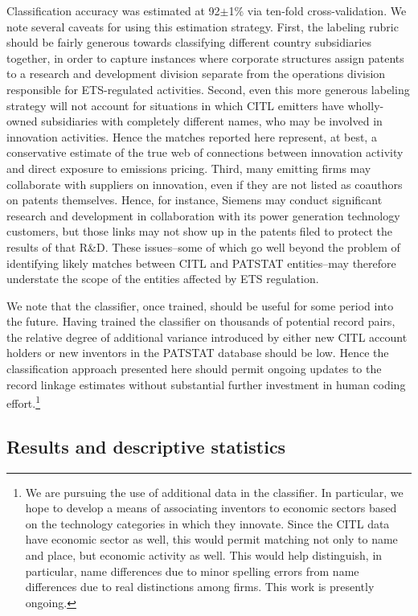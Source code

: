 \documentclass[11pt]{article}
\begin{document}
Classification accuracy was estimated at 92$\pm$1\% via ten-fold
cross-validation. We note several caveats for using this estimation
strategy. First, the labeling rubric should be fairly generous towards
classifying different country subsidiaries together, in order to
capture instances where corporate structures assign patents to a research and
development division separate from the operations division responsible
for ETS-regulated activities. Second, even this more generous labeling
strategy will not account for situations in which CITL emitters have
wholly-owned subsidiaries with completely different names, who may be
involved in innovation activities. Hence the matches reported here
represent, at best, a conservative estimate of the true web of
connections between innovation activity and direct exposure to
emissions pricing. Third, many emitting firms may collaborate with
suppliers on innovation, even if they are not listed as coauthors on
patents themselves. Hence, for instance, Siemens may conduct
significant research and development in collaboration with its power
generation technology customers, but those links may not show up in the patents
filed to protect the results of that R\&D. These issues--some of which
go well beyond the problem of identifying likely matches between CITL
and PATSTAT entities--may therefore understate the scope of the
entities affected by ETS regulation.

We note that the classifier, once trained, should be useful for some
period into the future. Having trained the classifier on thousands of
potential record pairs, the relative degree of additional variance
introduced by either new CITL account holders or new inventors in the
PATSTAT database should be low. Hence the classification approach
presented here should permit ongoing updates to the record linkage
estimates without substantial further investment in human coding
effort.\footnote{We are pursuing the use of additional data in the
  classifier. In particular, we hope to develop a means of associating
inventors to economic sectors based on the technology categories in
which they innovate. Since the CITL data have economic sector as well,
this would permit matching not only to name and place, but economic
activity as well. This would help distinguish, in particular, name
differences due to minor spelling errors from name differences due to
real distinctions among firms. This work is presently ongoing.}

\subsection{Results and descriptive statistics}
\label{sec:descr-stat}
\end{document}
